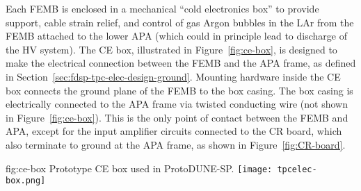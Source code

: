 Each FEMB is enclosed in a mechanical ``cold electronics box'' to provide support, cable strain
relief, and control of gas Argon bubbles in the LAr from the FEMB attached to the lower APA
(which could in principle lead to discharge of the HV system).
The CE box, illustrated in Figure~\ref{fig:ce-box}, is designed to make the electrical connection 
between the FEMB and the APA frame, as defined in Section~\ref{sec:fdsp-tpc-elec-design-ground}.
Mounting hardware inside the CE box connects the ground plane of the FEMB to the box casing. The
box casing is electrically connected to the APA frame via twisted conducting wire (not 
shown in Figure~\ref{fig:ce-box}). This is the only point of contact between the FEMB and
APA, except for the input amplifier circuits connected to the CR board, which also terminate to
ground at the APA frame, as shown in Figure~\ref{fig:CR-board}.

\begin{dunefigure}
{fig:ce-box}
{Prototype CE box used in ProtoDUNE-SP.}
\texttt{[image: tpcelec-box.png]}
\end{dunefigure}
